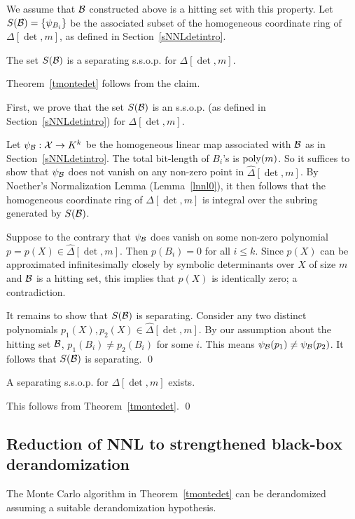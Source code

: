 \documentclass[11pt]{article}
\begin{document}
We  assume that ${\cal B}$ constructed  above  is  a hitting set with this property. 
Let $S({\cal B})=\{\psi_{B_i}\}$ be the associated subset 
of the homogeneous coordinate ring of $\Delta[\det,m]$, as defined in Section~\ref{sNNLdetintro}.


\begin{claim} \label{csepssop} 
The set  $S({\cal B})$ is a separating s.s.o.p. 
for $\Delta[\det,m]$. 
\end{claim}

Theorem~\ref{tmontedet}  follows from the claim.

First, we prove that the set  $S({\cal B})$ is an  s.s.o.p.
(as defined in  Section~\ref{sNNLdetintro}) for $\Delta[\det,m]$. 

Let $\psi_{{\cal B}}: {\cal X} \rightarrow K^k$ be the homogeneous linear map associated with ${\cal B}$ 
as   in Section~\ref{sNNLdetintro}. The total bit-length of $B_i$'s is ${\mbox {poly}}(m)$. So 
it suffices  to show that $\psi_{{\cal B}}$ does not vanish on any non-zero point  in $\hat \Delta[\det,m]$.
By Noether's Normalization Lemma (Lemma~\ref{lnnl0}), it then follows that the homogeneous coordinate ring of $\Delta[\det,m]$ is
integral over the subring generated by $S({\cal B})$.

Suppose to the contrary that $\psi_{{\cal B}}$ 
does vanish on some non-zero polynomial $p=p(X) \in \hat \Delta[\det,m]$. 
Then $p(B_i)=0$ for all $i \le k$. Since $p(X)$ can be approximated infinitesimally closely by symbolic determinants over $X$ of size $m$
and  ${\cal B}$ is a hitting set, this implies that $p(X)$ is identically zero; a contradiction. 

It remains to  show that  $S({\cal B})$ is separating.
Consider any  two distinct polynomials  $p_1(X),p_2(X) \in \hat \Delta[\det,m]$. 
By our assumption about the hitting set ${\cal B}$, $p_1(B_i) \not = p_2(B_i)$ for some $i$. 
This means  $\psi_{\cal B}(p_1) \not = \psi_{\cal B}(p_2)$. 
It follows that $S({\cal B})$ is separating.
\qed

\begin{cor} \label{cssopdet}
A separating s.s.o.p. for $\Delta[\det,m]$ exists.
\end{cor}
\proof This follows from Theorem~\ref{tmontedet}. \qed

\subsection{Reduction of NNL to strengthened black-box derandomization} \label{sdetpoly}
The Monte Carlo algorithm in Theorem~\ref{tmontedet} can  be derandomized assuming a suitable derandomization hypothesis.
\end{document}
